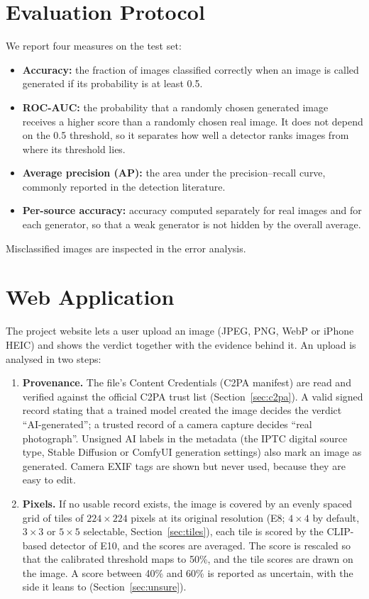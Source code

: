 \documentclass{mnnit}
\begin{document}
\section{Evaluation Protocol}
We report four measures on the test set:
\begingroup\keepwithlist
\begin{itemize}
  \item \textbf{Accuracy:} the fraction of images classified correctly
        when an image is called generated if its probability is at least
        0.5.
  \item \textbf{\mbox{ROC-AUC}:} the probability that a randomly chosen
        generated image receives a higher score than a randomly chosen
        real image. It does not depend on the 0.5 threshold, so it
        separates how well a detector ranks images from where its
        threshold lies.
  \item \textbf{Average precision (AP):} the area under the
        precision--recall curve, commonly reported in the detection
        literature.
  \item \textbf{Per-source accuracy:} accuracy computed separately for
        real images and for each generator, so that a weak generator is
        not hidden by the overall average.
\end{itemize}
\endgroup
Misclassified images are inspected in the error analysis.

\section{Web Application}
\label{sec:web}
The project website lets a user upload an image (JPEG, PNG, WebP or
iPhone HEIC) and shows the verdict together with the evidence behind it.
An upload is analysed in two steps:
\begin{enumerate}
  \item \textbf{Provenance.} The file's Content Credentials (C2PA
        manifest) are read and verified against the official C2PA trust
        list (Section~\ref{sec:c2pa}). A valid signed record stating
        that a trained model created the image decides the verdict
        ``AI-generated''; a trusted record of a camera capture decides
        ``real photograph''. Unsigned AI labels in the metadata (the IPTC
        digital source type, Stable Diffusion or ComfyUI generation
        settings) also mark an image as generated. Camera EXIF tags are
        shown but never used, because they are easy to edit.
  \item \textbf{Pixels.} If no usable record exists, the image is covered
        by an evenly spaced grid of tiles of $224\times224$ pixels at its
        original resolution (E8; $4\times4$ by default, $3\times3$ or
        $5\times5$ selectable, Section~\ref{sec:tiles}), each tile
        is scored by the CLIP-based detector of E10, and the scores are
        averaged. The score is rescaled so that the calibrated threshold
        maps to 50\%, and the tile scores are drawn on the image. A score
        between 40\% and 60\% is reported as uncertain, with the side it
        leans to (Section~\ref{sec:unsure}).
\end{enumerate}
\end{document}

